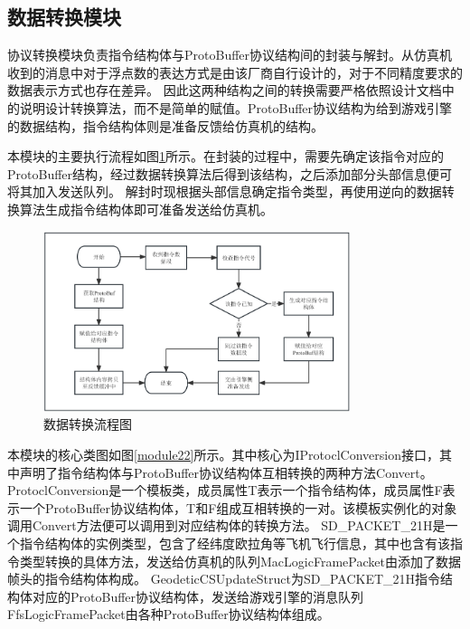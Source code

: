 \subsection{数据转换模块}
协议转换模块负责指令结构体与ProtoBuffer协议结构间的封装与解封。从仿真机收到的消息中对于浮点数的表达方式是由该厂商自行设计的，对于不同精度要求的数据表示方式也存在差异。
因此这两种结构之间的转换需要严格依照设计文档中的说明设计转换算法，而不是简单的赋值。ProtoBuffer协议结构为给到游戏引擎的数据结构，指令结构体则是准备反馈给仿真机的结构。
\par
本模块的主要执行流程如图\ref{module21}所示。在封装的过程中，需要先确定该指令对应的ProtoBuffer结构，经过数据转换算法后得到该结构，之后添加部分头部信息便可将其加入发送队列。
解封时现根据头部信息确定指令类型，再使用逆向的数据转换算法生成指令结构体即可准备发送给仿真机。

\begin{figure}[h!]
    \begin{center}
        \includegraphics[width=0.8\textwidth]{pictures/flowchart2.pdf}
        \caption{数据转换流程图}
        \label{module21}
    \end{center}
\end{figure}
\par
本模块的核心类图如图\ref{module22}所示。其中核心为IProtoclConversion接口，其中声明了指令结构体与ProtoBuffer协议结构体互相转换的两种方法Convert。
ProtoclConversion是一个模板类，成员属性T表示一个指令结构体，成员属性F表示一个ProtoBuffer协议结构体，T和F组成互相转换的一对。该模板实例化的对象调用Convert方法便可以调用到对应结构体的转换方法。
SD\_PACKET\_21H是一个指令结构体的实例类型，包含了经纬度欧拉角等飞机飞行信息，其中也含有该指令类型转换的具体方法，发送给仿真机的队列MacLogicFramePacket由添加了数据帧头的指令结构体构成。
GeodeticCSUpdateStruct为SD\_PACKET\_21H指令结构体对应的ProtoBuffer协议结构体，发送给游戏引擎的消息队列FfsLogicFramePacket由各种ProtoBuffer协议结构体组成。

